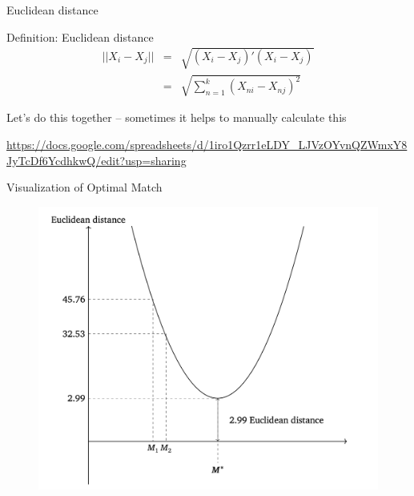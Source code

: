 \documentclass{beamer}
\newcommand*\colvec[1]{\begin{pmatrix}#1\end{pmatrix}}
\begin{document}
	

\begin{frame}{Euclidean distance}
	\begin{block}{Definition: Euclidean distance}
    \vspace*{-2.5mm}
    \begin{eqnarray*}
    ||X_i-X_j|| &=& \sqrt{ (X_i-X_j)'(X_i-X_j) } \\
    &=& \sqrt{ \sum_{n=1}^k (X_{ni} - X_{nj})^2 }
    \end{eqnarray*}
    \vspace*{-2.5mm}
	\end{block}
	
Let's do this together -- sometimes it helps to manually calculate this

\bigskip

\url{https://docs.google.com/spreadsheets/d/1iro1Qzrr1eLDY_LJVzOYvnQZWmxY8JyTcDf6YcdhkwQ/edit?usp=sharing}

	
\end{frame}

\begin{frame}{Visualization of Optimal Match}

\begin{figure}[!t]\centering
\includegraphics[scale=0.35]{./lecture_includes/optimal_match}
\end{figure}

\end{frame}
\end{document}
